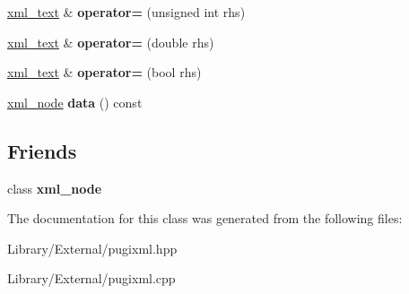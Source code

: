 \begin{DoxyCompactItemize}
\item 
\hypertarget{classpugi_1_1xml__text_a48e2aa3796629258d1f037d1bc2277f7}{}\hyperlink{classpugi_1_1xml__text}{xml\+\_\+text} \& {\bfseries operator=} (unsigned int rhs)\label{classpugi_1_1xml__text_a48e2aa3796629258d1f037d1bc2277f7}

\item 
\hypertarget{classpugi_1_1xml__text_a0ff3e37177494d9cdfa073c6392ca405}{}\hyperlink{classpugi_1_1xml__text}{xml\+\_\+text} \& {\bfseries operator=} (double rhs)\label{classpugi_1_1xml__text_a0ff3e37177494d9cdfa073c6392ca405}

\item 
\hypertarget{classpugi_1_1xml__text_afd64e76239853fcf57e80b8f43a3fb4d}{}\hyperlink{classpugi_1_1xml__text}{xml\+\_\+text} \& {\bfseries operator=} (bool rhs)\label{classpugi_1_1xml__text_afd64e76239853fcf57e80b8f43a3fb4d}

\item 
\hypertarget{classpugi_1_1xml__text_a30ca257f1614159c625d2904a6285224}{}\hyperlink{classpugi_1_1xml__node}{xml\+\_\+node} {\bfseries data} () const \label{classpugi_1_1xml__text_a30ca257f1614159c625d2904a6285224}

\end{DoxyCompactItemize}
\subsection*{Friends}
\begin{DoxyCompactItemize}
\item 
\hypertarget{classpugi_1_1xml__text_a156d917a92815c7b593bd5ef19f6d5fb}{}class {\bfseries xml\+\_\+node}\label{classpugi_1_1xml__text_a156d917a92815c7b593bd5ef19f6d5fb}

\end{DoxyCompactItemize}


The documentation for this class was generated from the following files\+:\begin{DoxyCompactItemize}
\item 
Library/\+External/pugixml.\+hpp\item 
Library/\+External/pugixml.\+cpp\end{DoxyCompactItemize}
